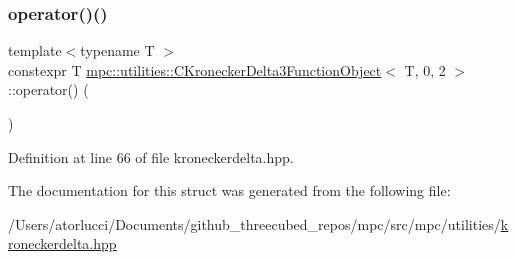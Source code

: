 \subsubsection{\texorpdfstring{operator()()}{operator()()}}
{\footnotesize\ttfamily template$<$typename T $>$ \\
constexpr T \mbox{\hyperlink{structmpc_1_1utilities_1_1_c_kronecker_delta3_function_object}{mpc\+::utilities\+::\+C\+Kronecker\+Delta3\+Function\+Object}}$<$ T, 0, 2 $>$\+::operator() (\begin{DoxyParamCaption}{ }\end{DoxyParamCaption})\hspace{0.3cm}{\ttfamily [inline]}}



Definition at line 66 of file kroneckerdelta.\+hpp.



The documentation for this struct was generated from the following file\+:\begin{DoxyCompactItemize}
\item 
/\+Users/atorlucci/\+Documents/github\+\_\+threecubed\+\_\+repos/mpc/src/mpc/utilities/\mbox{\hyperlink{kroneckerdelta_8hpp}{kroneckerdelta.\+hpp}}\end{DoxyCompactItemize}

